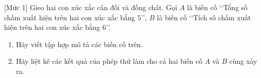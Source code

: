 \begin{bt}%
[Mức 1]
	Gieo hai con xúc xắc cân đối và đồng chất. Gọi $A$ là biến cố \lq\lq Tổng số chấm xuất hiện trên hai con xúc xắc bằng $5$\rq\rq, $B$ là biến cố \lq\lq Tích số chấm xuất hiện trên hai con xúc xắc bằng $6$\rq\rq.
	\begin{enumerate}
		\item Hãy viết tập hợp mô tả các biến cố trên.
		\item Hãy liệt kê các kết quả của phép thử làm cho cả hai biến cố $A$ và $B$ cùng xảy ra.
	\end{enumerate}
\end{bt}

